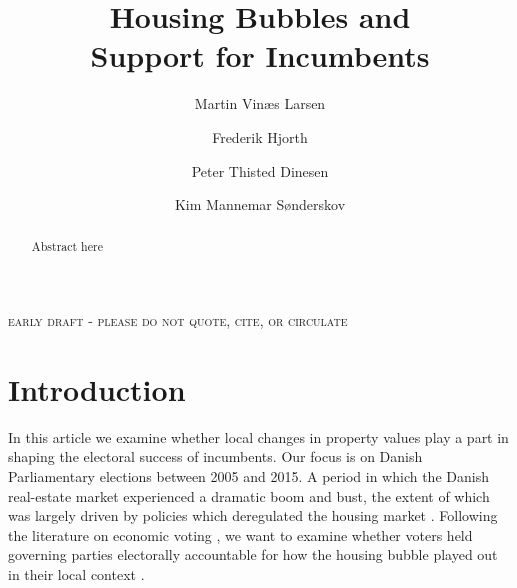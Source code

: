 \documentclass[12pt,a4paper]{article}
\title{\textbf{Housing Bubbles and \\Support for Incumbents}}
\author{
Martin Vinæs Larsen \and Frederik Hjorth \and Peter Thisted Dinesen \and Kim Mannemar Sønderskov    }
\begin{document}
\maketitle

\begin{center}
\textsc{early draft - please do not quote, cite, or circulate}
\end{center}

\begin{abstract} Abstract here
\noindent %
 
\end{abstract}



\newpage

\doublespacing

\section{Introduction}

In this article we examine whether local changes in property values play a part in shaping the electoral success of incumbents. Our focus is on Danish Parliamentary elections between 2005 and 2015. A period in which the Danish real-estate market  experienced a dramatic boom and bust, the extent of which was largely driven by policies which deregulated the housing market \citep{dam2011housing}. Following the literature on economic voting \citep{healy2013retrospective,lewis2013vp}, we want to examine whether voters held governing parties electorally accountable for how the housing bubble played out in their local context . 
\end{document}
